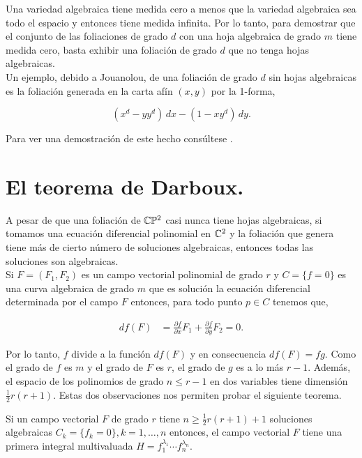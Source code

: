 Una variedad algebraica tiene medida cero a menos que la variedad algebraica sea todo el espacio y entonces tiene medida infinita. Por lo tanto, para demostrar que  el conjunto de las foliaciones de grado $d$ con una hoja algebraica de grado $m$ tiene medida cero, basta exhibir una foliación de grado $d$ que no tenga hojas algebraicas.\\

Un ejemplo, debido a Jouanolou, de una foliación de grado $d$ sin hojas algebraicas es la foliación generada en la carta afín $(x,y)$ por la 1-forma,

$$(x^{d}-yy^{d})\, dx-(1-xy^{d})\, dy.$$

Para ver una demostración de este hecho consúltese \cite{IlyaYako}.


\section{El teorema de Darboux.} 

A pesar de que una foliación de $\mathbb{C}\mathbb{P}^2$ casi nunca tiene hojas algebraicas, si tomamos una ecuación diferencial polinomial en $\mathbb{C}^{2}$ y la foliación que genera tiene más de cierto número de soluciones algebraicas, entonces todas las soluciones son algebraicas.\\

Si $F=(F_{1},F_{2})$ es un campo vectorial polinomial de grado $r$ y $C=\{f=0\}$ es una curva algebraica de grado $m$ que es solución la ecuación diferencial determinada por el campo $F$ entonces, para todo punto $p\in C$ tenemos que,

\begin{align}
df(F) &=\frac{\partial f}{\partial x}F_{1}+\frac{\partial f}{\partial y}F_{2}=0.
\end{align}

\noindent Por lo tanto, $f$ divide a la función $df(F)$ y en consecuencia $df(F)=fg$. Como el grado de $f$ es $m$ y el grado de $F$ es $r$, el grado de $g$ es a lo más $r-1$. Además, el espacio de los polinomios de grado $n\leq r-1$ en dos variables tiene dimensión $\frac{1}{2}r(r+1)$. Estas dos observaciones nos permiten probar el siguiente teorema.

\begin{Teorema}
\label{Teo:AnteDarboux}
Si un campo vectorial $F$ de grado $r$ tiene $n\geq \frac{1}{2}r(r+1)+1$ soluciones algebraicas $C_{k}=\{f_{k}=0\}, k=1,\ldots,n$ entonces, el campo vectorial $F$ tiene una primera integral multivaluada $H=f_{1}^{\lambda_{1}}\cdots f_{n}^{\lambda_{n}}$.
\end{Teorema}

